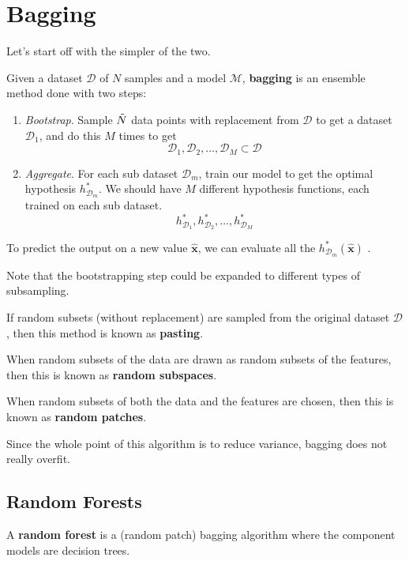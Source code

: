 \section{Bagging}

  Let's start off with the simpler of the two. 

  \begin{definition}
    Given a dataset $\mathcal{D}$ of $N$ samples and a model $\mathcal{M}$, \textbf{bagging} is an ensemble method done with two steps: 
    \begin{enumerate}
      \item \textit{Bootstrap}. Sample $\Tilde{N}$ data points with replacement from $\mathcal{D}$ to get a dataset $\mathcal{D}_1$, and do this $M$ times to get 
      \[\mathcal{D}_1, \mathcal{D}_2, \ldots, \mathcal{D}_M \subset \mathcal{D}\]
      \item \textit{Aggregate}. For each sub dataset $\mathcal{D}_m$, train our model to get the optimal hypothesis $h_{\mathcal{D}_m}^\ast$. We should have $M$ different hypothesis functions, each trained on each sub dataset. 
      \[h_{\mathcal{D}_1}^\ast, h_{\mathcal{D}_2}^\ast, \ldots, h_{\mathcal{D}_M}^\ast\]
    \end{enumerate}
    To predict the output on a new value $\hat{\mathbf{x}}$, we can evaluate all the $h_{\mathcal{D}_m}^\ast (\hat{\mathbf{x}})$ .
  \end{definition}

  Note that the bootstrapping step could be expanded to different types of subsampling. 

  \begin{definition}[Pasting]
    If random subsets (without replacement) are sampled from the original dataset $\mathcal{D}$, then this method is known as \textbf{pasting}. 
  \end{definition}

  \begin{definition}
    When random subsets of the data are drawn as random subsets of the features, then this is known as \textbf{random subspaces}. 
  \end{definition}

  \begin{definition}
    When random subsets of both the data and the features are chosen, then this is known as \textbf{random patches}. 
  \end{definition}

  Since the whole point of this algorithm is to reduce variance, bagging does not really overfit. 

\subsection{Random Forests}

  \begin{definition}
    A \textbf{random forest} is a (random patch) bagging algorithm where the component models are decision trees.  
  \end{definition}

